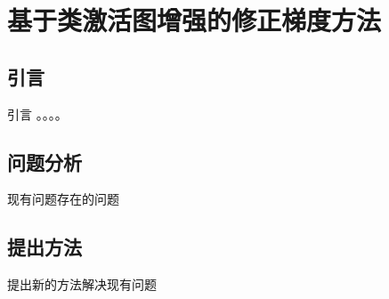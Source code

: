 \chapter{基于类激活图增强的修正梯度方法}
\label{chap3}

\section{引言}
引言 。。。。



\section{问题分析}
现有问题存在的问题


\section{提出方法}
提出新的方法解决现有问题